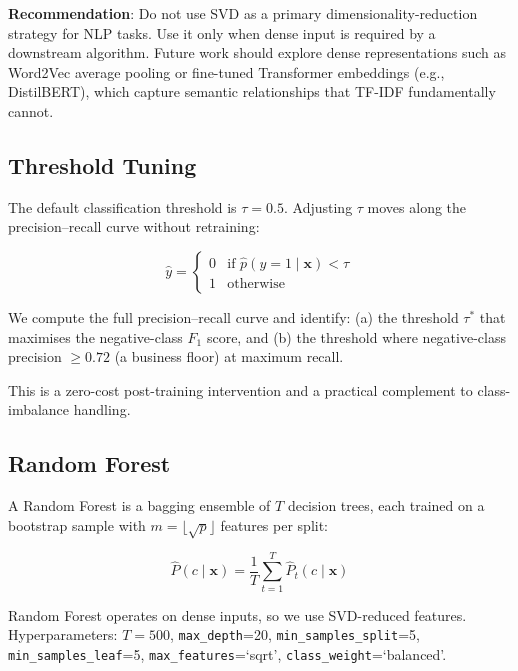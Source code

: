 \documentclass[11pt,a4paper]{article}
\begin{document}
\textbf{Recommendation}: Do not use SVD as a primary dimensionality-reduction
strategy for NLP tasks. Use it only when dense input is required by a
downstream algorithm. Future work should explore dense representations
such as Word2Vec average pooling or fine-tuned Transformer embeddings
(e.g., DistilBERT), which capture semantic relationships that TF-IDF
fundamentally cannot.

\subsection{Threshold Tuning}
\label{sec:threshold}

The default classification threshold is $\tau = 0.5$.
Adjusting $\tau$ moves along the precision--recall curve without retraining:

\begin{equation}
  \hat{y} = \begin{cases}
    0 & \text{if } \hat{p}(y=1 \mid \mathbf{x}) < \tau \\
    1 & \text{otherwise}
  \end{cases}
\end{equation}

We compute the full precision--recall curve and identify:
(a) the threshold $\tau^*$ that maximises the negative-class $F_1$
    score, and
(b) the threshold where negative-class precision $\geq 0.72$
    (a business floor) at maximum recall.

This is a zero-cost post-training intervention and a practical complement
to class-imbalance handling.

\subsection{Random Forest}

A Random Forest is a bagging ensemble of $T$ decision trees,
each trained on a bootstrap sample with $m = \lfloor\sqrt{p}\rfloor$
features per split:

\begin{equation}
  \hat{P}(c \mid \mathbf{x}) = \frac{1}{T}\sum_{t=1}^{T}\hat{P}_t(c \mid \mathbf{x})
\end{equation}

Random Forest operates on dense inputs, so we use SVD-reduced features.
Hyperparameters: $T=500$, \texttt{max\_depth}=20,
\texttt{min\_samples\_split}=5, \texttt{min\_samples\_leaf}=5,
\texttt{max\_features}=`sqrt', \texttt{class\_weight}=`balanced'.
\end{document}

